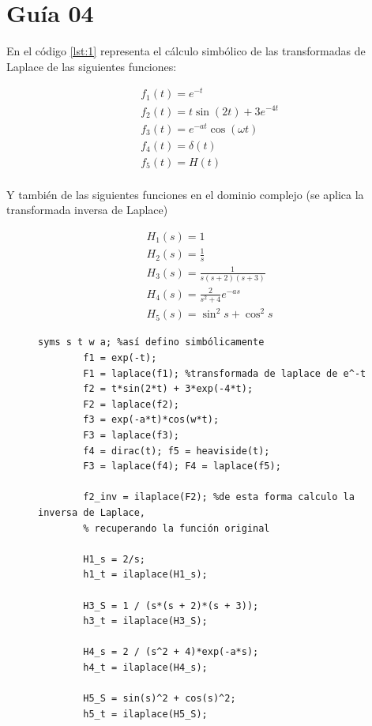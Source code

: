 \documentclass[twoside]{article}
\begin{document}
\newpage

\section{Guía 04}

En el código \ref{lst:1} representa el cálculo simbólico de las transformadas de Laplace de las siguientes funciones:

\begin{align*}
    &f_1(t) = e^{-t}\\
    &f_2(t) = t\sin(2t) + 3e^{-4t}\\
    &f_3(t) = e^{-at}\cos(\omega t) \\
    &f_4(t) = \delta (t) \\
    &f_5(t) = H (t) \\
\end{align*}


\noindent Y también de las siguientes funciones en el dominio complejo (se aplica la transformada inversa de Laplace)

\begin{align*}
    &H_1(s) = 1\\
    &H_2(s) = \frac{1}{s}\\
    &H_3(s) = \frac{1}{s(s+2)(s+3)}\\
    &H_4(s) = \frac{2}{s^2+4}e^{-as}\\
    &H_5(s) = \sin^2 s  + \cos^2 s
\end{align*}

\begin{figure}[ht!]
    \begin{lstlisting}[caption={Cálculo de transformada y anti-transformada de Laplace}, label={lst:1}]
        syms s t w a; %así defino simbólicamente 
        f1 = exp(-t);
        F1 = laplace(f1); %transformada de laplace de e^-t
        f2 = t*sin(2*t) + 3*exp(-4*t);
        F2 = laplace(f2);
        f3 = exp(-a*t)*cos(w*t);
        F3 = laplace(f3);
        f4 = dirac(t); f5 = heaviside(t);
        F3 = laplace(f4); F4 = laplace(f5);

        f2_inv = ilaplace(F2); %de esta forma calculo la inversa de Laplace, 
        % recuperando la función original

        H1_s = 2/s;
        h1_t = ilaplace(H1_s);

        H3_S = 1 / (s*(s + 2)*(s + 3));
        h3_t = ilaplace(H3_S);

        H4_s = 2 / (s^2 + 4)*exp(-a*s);
        h4_t = ilaplace(H4_s);

        H5_S = sin(s)^2 + cos(s)^2;
        h5_t = ilaplace(H5_S);
    \end{lstlisting}    
\end{figure}
\end{document}
